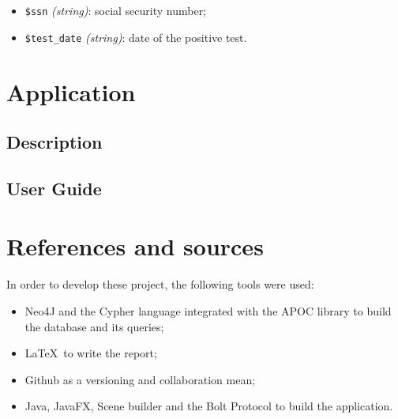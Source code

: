 \documentclass[12pt, a4paper]{article}
\begin{document}
\begin{itemize}
    \item \texttt{\$ssn} \emph{(string)}: social security number;
    \item \texttt{\$test\_date} \emph{(string)}: date of the positive test.
\end{itemize}

\clearpage

\section{Application}

\subsection{Description}

\blindtext

\subsection{User Guide}

\blindtext

\clearpage

\section{References and sources}

In order to develop these project, the following tools were used:

\begin{itemize}
    \item Neo4J and the Cypher language integrated with the APOC library 
        to build the database and its queries;
    \item \LaTeX~to write the report;
    \item Github as a versioning and collaboration mean;
    \item Java, JavaFX, Scene builder and the Bolt Protocol to build 
        the application.
\end{itemize}

\clearpage
\end{document}

